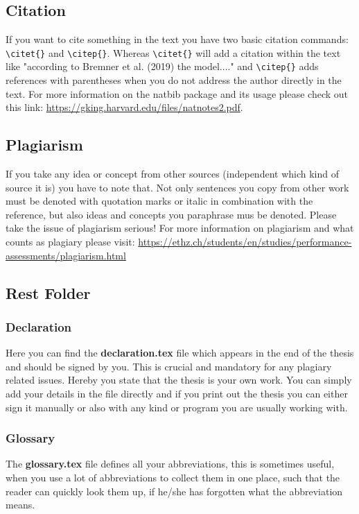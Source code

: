 \subsection{Citation}
If you want to cite something in the text you have two basic citation commands: \verb!\citet{}! and \verb!\citep{}!. Whereas \verb!\citet{}! will add a citation within the text like "according to Bremner et al. (2019) the model...." and \verb!\citep{}! adds references with parentheses when you do not address the author directly in the text. For more information on the natbib package and its usage please check out this link: \url{https://gking.harvard.edu/files/natnotes2.pdf}.

\subsection{Plagiarism}
If you take any idea or concept from other sources (independent which kind of source it is) you have to note that. Not only sentences you copy from other work must be denoted with quotation marks or italic in combination with the reference, but also ideas and concepts you paraphrase mus be denoted. Please take the issue of plagiarism serious! For more information on plagiarism and what counts as plagiary please visit: \url{https://ethz.ch/students/en/studies/performance-assessments/plagiarism.html}

\subsection{Rest Folder}

\subsubsection{Declaration}
Here you can find the \textbf{declaration.tex} file which appears in the end of the thesis and should be signed by you. This is crucial and mandatory for any plagiary related issues. Hereby you state that the thesis is your own work. You can simply add your details in the file directly and if you print out the thesis you can either sign it manually or also with any kind or program you are usually working with.

\subsubsection{Glossary}
The \textbf{glossary.tex} file defines all your abbreviations, this is sometimes useful, when you use a lot of abbreviations to collect them in one place, such that the reader can quickly look them up, if he/she has forgotten what the abbreviation means.

